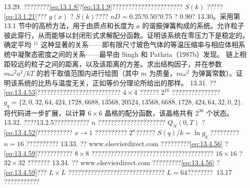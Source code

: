 13.29. ????????\autoref{eq:13.1.8}?\autoref{eq:13.1.9}?????????????????????? \(S(k)\) ?????\autoref{eq:13.1.21}??? \(g(x)\) ? \(S(k)\)???? \(nD = 0.25\)?\(0.50\)?\(0.75\) ? \(0.90\)?
13.30。采用第 13.1 节中的高桥方法，用于由质点和长度为 \(a\) 的谐振弹簧构成的系统。允许粒子彼此穿行，从而能够以封闭形式求解配分函数。证明该系统在零压力下是稳定的。确定平均
\(^{11}\) 这种显著的关系——即有限尺寸玻色气体的等温压缩率与相应体相系统中凝聚态密度之间的关系——最早由 Singh 和 Pathria（1987b）发现。
链上相距较远的粒子之间的距离，以及该距离的方差。求出结构因子，并在参数 \(m\omega^2a^2/kT\) 的若干取值范围内进行绘图（其中 \(m\) 为质量，\(m\omega^2\) 为弹簧常数）。证明该系统的比热与温度无关，正如等价分理论所给出的那样。
13.31. ??\autoref{eq:13.4.53}?????????????????????????? \(4 \times 4\) ?????? \(2^{16}\) ???????????????
\(g_{q}=\{2,0,32,64,424,1728,6688,13568,20524,13568,6688,1728,424,64,32,0,2\}.\)
将代码进一步扩展，以计算 \(6 \times 6\) 晶格的配分函数，该晶格共有 \(2^{36}\) 个状态。
13.32. ????13.2.5??????????? \(n\) ????????????????????? \(Q_{N}(0,T)\) ?\autoref{eq:13.4.52}??????????? \(x \rightarrow 1\) ?????????? \(2^{n}\)?????? \(S(q)/k = \ln g_{q}\) ????????? \(n = 16\) ??????????
13.33. ?? www.elsevierdirect.com ?????????\autoref{eq:13.4.56} ? \autoref{eq:13.4.59}??????????? \(8 \times 8\) ?????????????????????????????????????? \(16 \times 16\) ? \(32 \times 32\) ???????
13.34. ?? www.elsevierdirect.com ?????????\autoref{eq:13.4.56} ? \autoref{eq:13.4.59}??? \(L \times L\) ?????????????????????????????? \(L = 64\)????????~13.17 ???????????




